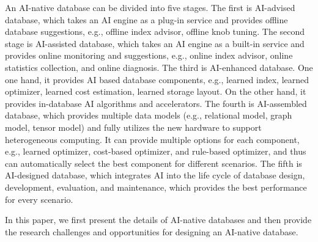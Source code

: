 An AI-native database can be divided into five stages. The first is AI-advised database, which takes an AI engine as a plug-in service and provides offline database suggestions, e.g., offline index advisor, offline knob tuning. The second stage is AI-assisted database, which takes an AI engine as a built-in service and provides online monitoring and suggestions, e.g., online index advisor, online statistics collection, and online diagnosis. The third is AI-enhanced database. One one hand, it provides AI based database components, e.g., learned index, learned optimizer, learned cost estimation, learned storage layout. On the other hand, it provides in-database AI algorithms and accelerators. The fourth is AI-assembled database, which provides multiple data models (e.g., relational model, graph model, tensor model) and fully utilizes the new hardware to support heterogeneous computing. It can provide multiple options for each component, e.g., learned optimizer, cost-based optimizer, and rule-based optimizer, and thus can automatically select the best component for different scenarios. The fifth is AI-designed database, which integrates AI into the life cycle of database design, development, evaluation, and maintenance, which provides the best performance for every scenario. 


In this paper, we first present the details of AI-native databases and then provide the research challenges and opportunities for designing an AI-native database. 











